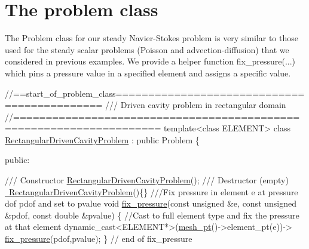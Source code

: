  

\hypertarget{index_problem}{}\section{The problem class}\label{index_problem}
The {\ttfamily Problem} class for our steady Navier-\/\+Stokes problem is very similar to those used for the steady scalar problems (Poisson and advection-\/diffusion) that we considered in previous examples. We provide a helper function {\ttfamily fix\+\_\+pressure}(...) which pins a pressure value in a specified element and assigns a specific value.

 
\begin{DoxyCodeInclude}
\textcolor{comment}{//==start\_of\_problem\_class============================================}
\textcolor{comment}{/// Driven cavity problem in rectangular domain}
\textcolor{comment}{}\textcolor{comment}{//====================================================================}
\textcolor{keyword}{template}<\textcolor{keyword}{class} ELEMENT>
\textcolor{keyword}{class }\hyperlink{classRectangularDrivenCavityProblem}{RectangularDrivenCavityProblem} : \textcolor{keyword}{public} Problem
\{

\textcolor{keyword}{public}:

\textcolor{comment}{}
\textcolor{comment}{ /// Constructor}
\textcolor{comment}{} \hyperlink{classRectangularDrivenCavityProblem_ad7382f68a780f86ea5f0e9b7d4d119ec}{RectangularDrivenCavityProblem}();
\textcolor{comment}{}
\textcolor{comment}{ /// Destructor (empty)}
\textcolor{comment}{} \hyperlink{classRectangularDrivenCavityProblem_a0233981e33e2bd9db424b19e51a0faef}{~RectangularDrivenCavityProblem}()\{\}
\textcolor{comment}{}
\textcolor{comment}{ ///Fix pressure in element e at pressure dof pdof and set to pvalue}
\textcolor{comment}{} \textcolor{keywordtype}{void} \hyperlink{classRectangularDrivenCavityProblem_ac02d80f5241eeb04571577ce3b9f35a3}{fix\_pressure}(\textcolor{keyword}{const} \textcolor{keywordtype}{unsigned} &e, \textcolor{keyword}{const} \textcolor{keywordtype}{unsigned} &pdof, 
                   \textcolor{keyword}{const} \textcolor{keywordtype}{double} &pvalue)
  \{
   \textcolor{comment}{//Cast to full element type and fix the pressure at that element}
   \textcolor{keyword}{dynamic\_cast<}ELEMENT*\textcolor{keyword}{>}(\hyperlink{classRectangularDrivenCavityProblem_a408035d1f224641db75a2f48074e9593}{mesh\_pt}()->element\_pt(e))->
                          \hyperlink{classRectangularDrivenCavityProblem_ac02d80f5241eeb04571577ce3b9f35a3}{fix\_pressure}(pdof,pvalue);
  \} \textcolor{comment}{// end of fix\_pressure}

\end{DoxyCodeInclude}


